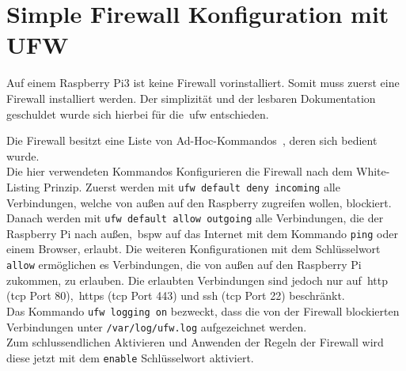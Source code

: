 
\section{Simple Firewall Konfiguration mit UFW}\label{sec:simple-firewall-konfiguration}
Auf einem Raspberry Pi3 ist keine Firewall vorinstalliert.
Somit muss zuerst eine Firewall installiert werden.
Der simplizität und der lesbaren Dokumentation geschuldet wurde sich hierbei für die~\gls{ufw} entschieden.

Die Firewall besitzt eine Liste von Ad-Hoc-Kommandos~\cite{ufw-doc}, deren sich bedient wurde. \\

Die hier verwendeten Kommandos Konfigurieren die Firewall nach dem White-Listing Prinzip.
Zuerst werden mit \texttt{ufw default deny incoming} alle Verbindungen, welche von außen auf den Raspberry zugreifen wollen, blockiert.
Danach werden mit \texttt{ufw default allow outgoing} alle Verbindungen, die der Raspberry Pi nach außen,~\gls{bspw} auf
das Internet mit dem Kommando \texttt{ping} oder einem Browser, erlaubt.
Die weiteren Konfigurationen mit dem Schlüsselwort \texttt{allow} ermöglichen es Verbindungen, die von außen auf den Raspberry Pi zukommen,
zu erlauben.
Die erlaubten Verbindungen sind jedoch nur auf~\gls{http} (\gls{tcp} Port 80),~\gls{https} (\gls{tcp} Port 443) und \gls{ssh} (\gls{tcp} Port 22) beschränkt. \\
Das Kommando \texttt{ufw logging on} bezweckt, dass die von der Firewall blockierten Verbindungen unter \texttt{/var/log/ufw.log} aufgezeichnet werden. \\
Zum schlussendlichen Aktivieren und Anwenden der Regeln der Firewall wird diese jetzt mit dem \texttt{enable} Schlüsselwort aktiviert.
